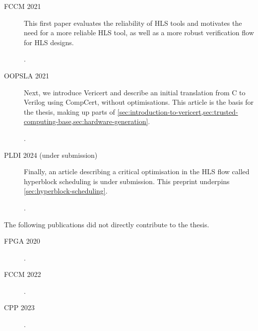 \begin{description}

\item[FCCM 2021] This first paper evaluates the reliability of \gls{HLS} tools
  and motivates the need for a more reliable \gls{HLS} tool, as well as a more
  robust verification flow for \gls{HLS} designs.

  .

\item[OOPSLA 2021] Next, we introduce Vericert and describe an initial
  translation from C to Verilog using \gls{CompCert}, without optimisations.
  This article is the basis for the thesis, making up parts of
  \ref{sec:introduction-to-vericert,sec:trusted-computing-base,sec:hardware-generation}.

  .

\item[PLDI 2024 (under submission)] Finally, an article describing a critical
  optimisation in the \gls{HLS} flow called \gls{hyperblock scheduling} is under
  submission.  This preprint underpins \cref{sec:hyperblock-scheduling}.

  .

\end{description}

The following publications did not directly contribute to the thesis.

\begin{description}
\item[FPGA 2020] .
\item[FCCM 2022] .
\item[CPP 2023] .
\end{description}

